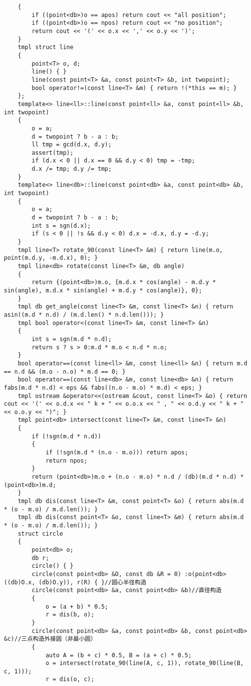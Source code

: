 \documentclass[12pt]{ctexart}
\begin{document}
\begin{lstlisting}
	{
		if ((point<db>)o == apos) return cout << "all position";
		if ((point<db>)o == npos) return cout << "no position";
		return cout << '(' << o.x << ',' << o.y << ')';
	}
	tmpl struct line
	{
		point<T> o, d;
		line() { }
		line(const point<T> &a, const point<T> &b, int twopoint);
		bool operator!=(const line<T> &m) { return !(*this == m); }
	};
	template<> line<ll>::line(const point<ll> &a, const point<ll> &b, int twopoint)
	{
		o = a;
		d = twopoint ? b - a : b;
		ll tmp = gcd(d.x, d.y);
		assert(tmp);
		if (d.x < 0 || d.x == 0 && d.y < 0) tmp = -tmp;
		d.x /= tmp; d.y /= tmp;
	}
	template<> line<db>::line(const point<db> &a, const point<db> &b, int twopoint)
	{
		o = a;
		d = twopoint ? b - a : b;
		int s = sgn(d.x);
		if (s < 0 || !s && d.y < 0) d.x = -d.x, d.y = -d.y;
	}
	tmpl line<T> rotate_90(const line<T> &m) { return line(m.o, point(m.d.y, -m.d.x), 0); }
	tmpl line<db> rotate(const line<T> &m, db angle)
	{
		return {(point<db>)m.o, {m.d.x * cos(angle) - m.d.y * sin(angle), m.d.x * sin(angle) + m.d.y * cos(angle)}, 0};
	}
	tmpl db get_angle(const line<T> &m, const line<T> &n) { return asin((m.d * n.d) / (m.d.len() * n.d.len())); }
	tmpl bool operator<(const line<T> &m, const line<T> &n)
	{
		int s = sgn(m.d * n.d);
		return s ? s > 0:m.d * m.o < n.d * n.o;
	}
	bool operator==(const line<ll> &m, const line<ll> &n) { return m.d == n.d && (m.o - n.o) * m.d == 0; }
	bool operator==(const line<db> &m, const line<db> &n) { return fabs(m.d * n.d) < eps && fabs((n.o - m.o) * m.d) < eps; }
	tmpl ostream &operator<<(ostream &cout, const line<T> &o) { return cout << '(' << o.d.x << " k + " << o.o.x << " , " << o.d.y << " k + " << o.o.y << ")"; }
	tmpl point<db> intersect(const line<T> &m, const line<T> &n)
	{
		if (!sgn(m.d * n.d))
		{
			if (!sgn(m.d * (n.o - m.o))) return apos;
			return npos;
		}
		return (point<db>)m.o + (n.o - m.o) * n.d / (db)(m.d * n.d) * (point<db>)m.d;
	}
	tmpl db dis(const line<T> &m, const point<T> &o) { return abs(m.d * (o - m.o) / m.d.len()); }
	tmpl db dis(const point<T> &o, const line<T> &m) { return abs(m.d * (o - m.o) / m.d.len()); }
	struct circle
	{
		point<db> o;
		db r;
		circle() { }
		circle(const point<db> &O, const db &R = 0) :o(point<db>((db)O.x, (db)O.y)), r(R) { }//圆心半径构造
		circle(const point<db> &a, const point<db> &b)//直径构造
		{
			o = (a + b) * 0.5;
			r = dis(b, o);
		}
		circle(const point<db> &a, const point<db> &b, const point<db> &c)//三点构造外接圆（非最小圆）
		{
			auto A = (b + c) * 0.5, B = (a + c) * 0.5;
			o = intersect(rotate_90(line(A, c, 1)), rotate_90(line(B, c, 1)));
			r = dis(o, c);

\end{lstlisting}
\end{document}
